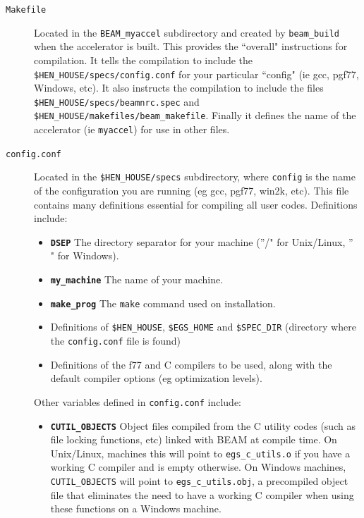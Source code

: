 \documentclass[12pt,twoside]{article}
\begin{document}
\begin{description}
\item [{\tt Makefile}] Located in the {\tt BEAM\_myaccel} subdirectory
and created by {\tt beam\_build} when the accelerator is built.
This provides the ``overall" instructions for compilation.
It tells the compilation to include the {\tt \$HEN\_HOUSE/specs/config.conf}
for your particular ``config" (ie gcc, pgf77, Windows, etc).  It also
instructs the compilation to include the files {\tt \$HEN\_HOUSE/specs/beamnrc.spec} and {\tt \$HEN\_HOUSE/makefiles/beam\_makefile}.  Finally it defines
the name of the accelerator (ie {\tt myaccel}) for use in other files.
\item [{\tt config.conf}] Located in the {\tt \$HEN\_HOUSE/specs} subdirectory,
where {\tt config} is the name of the configuration you are running
(eg gcc, pgf77, win2k, etc).  This file contains many
definitions essential for compiling all user
codes.  Definitions include:
\begin{itemize}
\item {\bf \tt DSEP} The directory separator for your machine
(''/" for Unix/Linux, ''\\" for Windows).
\item {\bf \tt my\_machine} The name of your machine.
\item {\bf \tt make\_prog} The {\tt make} command used on installation.
\item Definitions of {\tt \$HEN\_HOUSE}, {\tt \$EGS\_HOME} and
     {\tt \$SPEC\_DIR} (directory where the {\tt config.conf} file is
found)
\item Definitions of the f77 and C compilers
to be used, along with the default compiler options (eg optimization levels).
\end{itemize}
Other variables defined in {\tt config.conf} include:
\begin{itemize}
\item {\bf \tt CUTIL\_OBJECTS} Object files compiled from the C utility
codes (such as file locking functions, etc) linked with BEAM at compile
time.  On Unix/Linux, machines this will point to {\tt egs\_c\_utils.o}
if you have a working C compiler and is empty otherwise.  On Windows machines,
{\tt CUTIL\_OBJECTS} will point to {\tt egs\_c\_utils.obj}, a precompiled
object file that eliminates the need to have a working C compiler when
using these functions on a Windows machine.

\end{itemize}
\end{description}
\end{document}
